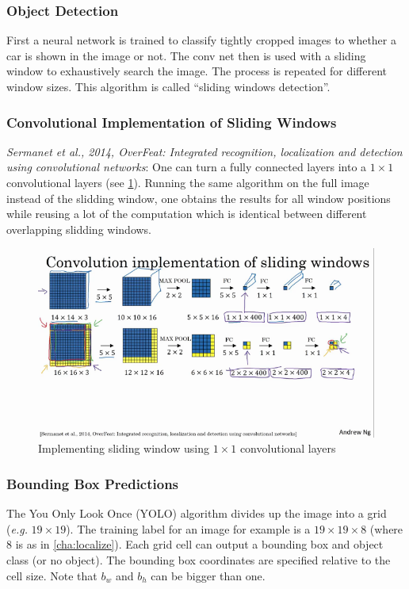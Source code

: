 \documentclass{article}
\begin{document}
\subsubsection{Object Detection}
First a neural network is trained to classify tightly cropped images to whether a car is shown in the image or not.
The conv net then is used with a sliding window to exhaustively search the image.
The process is repeated for different window sizes.
This algorithm is called ``sliding windows detection''.

\subsubsection{Convolutional Implementation of Sliding Windows}\label{cha:cnnslide}
\emph{Sermanet et al., 2014, OverFeat: Integrated recognition, localization and detection using convolutional networks}:
One can turn a fully connected layers into a $1\times 1$ convolutional layers (see \cref{fig:convslide}).
Running the same algorithm on the full image instead of the slidding window, one obtains the results for all window positions
while reusing a lot of the computation which is identical between different overlapping slidding windows.
\begin{figure}
  \begin{center}
    \includegraphics[width=\textwidth]{convslide}
    \caption{Implementing sliding window using $1\times 1$ convolutional layers}
    \label{fig:convslide}
  \end{center}
\end{figure}

\subsubsection{Bounding Box Predictions}\label{cha:bbpred}
The You Only Look Once (YOLO) algorithm divides up the image into a grid (\emph{e.g.} $19\times 19$).
The training label for an image for example is a $19\times 19\times 8$ (where $8$ is as in \cref{cha:localize}).
Each grid cell can output a bounding box and object class (or no object).
The bounding box coordinates are specified relative to the cell size.
Note that $b_w$ and $b_h$ can be bigger than one.
\end{document}
